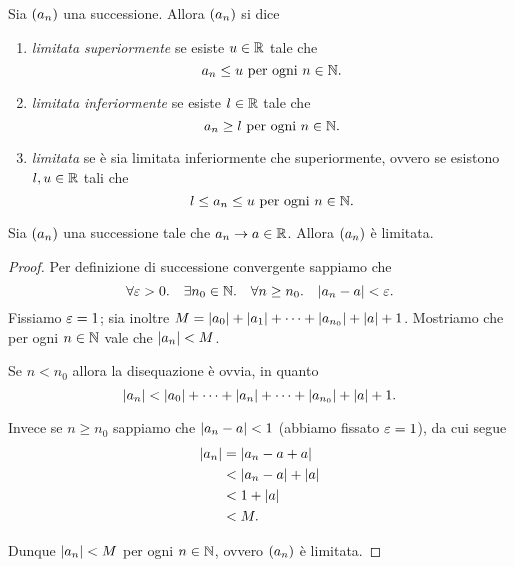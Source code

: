 \begin{definition}
     \label{def:succ_limit}
    Sia $\seqn*{a}$ una successione. 
    Allora $\seqn*{a}$ si dice \begin{enumerate}[label={(\roman*)}]
        \item \emph{limitata superiormente} se esiste $u \in \R$ tale che \begin{equation}
            \label{def:succ_bound:sup} a_n \leq u \text{  per ogni } n \in \N.
        \end{equation}
        \item \emph{limitata inferiormente} se esiste $l \in \R$ tale che \begin{equation}
            \label{def:succ_bound:inf} a_n \geq l \text{  per ogni } n \in \N.
        \end{equation}
        \item \emph{limitata} se è sia limitata inferiormente che superiormente, ovvero se esistono $l, u \in \R$ tali che \begin{equation}
            \label{def:succ_bound:both} l \leq a_n \leq u \text{  per ogni } n \in \N.
        \end{equation}
    \end{enumerate}
\end{definition}

\begin{proposition}
     \label{prop:succ_conv=>limit}
    Sia $\seqn*{a}$ una successione tale che $a_n \to a \in \R$. Allora $\seqn*{a}$ è limitata.
\end{proposition}
\begin{proof}
    Per definizione di successione convergente sappiamo che \[
        \forall \eps > 0. \quad \exists n_0 \in \N. \quad \forall n \geq n_0. \quad \abs*{a_n - a} < \eps.    
    \] Fissiamo $\eps = 1$; sia inoltre $M = \abs*{a_0} + \abs*{a_1} + \dots + \abs*{a_{n_0}} + \abs*{a} + 1$. Mostriamo che per ogni $n \in \N$ vale che $\abs*{a_n} < M$.

    Se $n < n_0$ allora la disequazione è ovvia, in quanto \[
        \abs*{a_n} < \abs*{a_0} + \dots + \abs*{a_n} + \dots + \abs*{a_{n_0}} + \abs*{a} + 1.    
    \]

    Invece se $n \geq n_0$ sappiamo che $\abs*{a_n - a} < 1$ (abbiamo fissato $\eps = 1$), da cui segue \begin{align*}
        \abs*{a_n} &= \abs*{a_n - a + a} \\
        &< \abs*{a_n - a} + \abs*{a} \\
        &< 1 + \abs*{a} \\
        &< M.
    \end{align*}

    Dunque $\abs*{a_n} < M$ per ogni $n \in \N$, ovvero $\seqn*{a}$ è limitata.
\end{proof}

